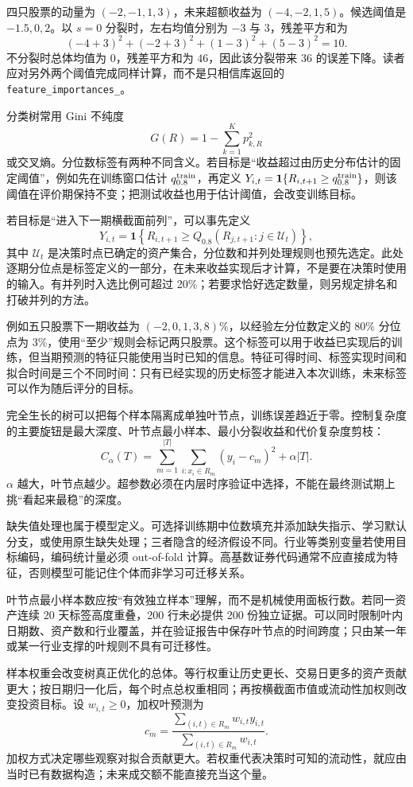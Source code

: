 四只股票的动量为 $(-2,-1,1,3)$，未来超额收益为 $(-4,-2,1,5)$。候选阈值是 $-1.5,0,2$。以 $s=0$ 分裂时，左右均值分别为 $-3$ 与 $3$，残差平方和为
\[
(-4+3)^2+(-2+3)^2+(1-3)^2+(5-3)^2=10.
\]
不分裂时总体均值为 0，残差平方和为 $46$，因此该分裂带来 $36$ 的误差下降。读者应对另外两个阈值完成同样计算，而不是只相信库返回的 \texttt{feature\_importances\_}。

分类树常用 Gini 不纯度
\[
G(R)=1-\sum_{k=1}^K p_{k,R}^2
\]
或交叉熵。分位数标签有两种不同含义。若目标是“收益超过由历史分布估计的固定阈值”，例如先在训练窗口估计 $q_{0.8}^{\rm train}$，再定义 $Y_{i,t}=\mathbf1\{R_{i,t+1}\ge q_{0.8}^{\rm train}\}$，则该阈值在评价期保持不变；把测试收益也用于估计阈值，会改变训练目标。

若目标是“进入下一期横截面前列”，可以事先定义
\[
 Y_{i,t}=\mathbf1\!\left\{R_{i,t+1}\ge
 Q_{0.8}(R_{j,t+1}:j\in\mathcal U_t)\right\},
\]
其中 $\mathcal U_t$ 是决策时点已确定的资产集合，分位数和并列处理规则也预先选定。此处逐期分位点是标签定义的一部分，在未来收益实现后才计算，不是要在决策时使用的输入。有并列时入选比例可超过 20\%；若要求恰好选定数量，则另规定排名和打破并列的方法。

例如五只股票下一期收益为 $(-2,0,1,3,8)\%$，以经验左分位数定义的 80\% 分位点为 3\%，使用“至少”规则会标记两只股票。这个标签可以用于收益已实现后的训练，但当期预测的特征只能使用当时已知的信息。特征可得时间、标签实现时间和拟合时间是三个不同时间：只有已经实现的历史标签才能进入本次训练，未来标签可以作为随后评分的目标。


完全生长的树可以把每个样本隔离成单独叶节点，训练误差趋近于零。控制复杂度的主要旋钮是最大深度、叶节点最小样本、最小分裂收益和代价复杂度剪枝：
\[
C_\alpha(T)=\sum_{m=1}^{|T|}\sum_{i:x_i\in R_m}(y_i-c_m)^2+\alpha|T|.
\]
$\alpha$ 越大，叶节点越少。超参数必须在内层时序验证中选择，不能在最终测试期上挑“看起来最稳”的深度。

缺失值处理也属于模型定义。可选择训练期中位数填充并添加缺失指示、学习默认分支，或使用原生缺失处理；三者隐含的经济假设不同。行业等类别变量若使用目标编码，编码统计量必须 out-of-fold 计算。高基数证券代码通常不应直接成为特征，否则模型可能记住个体而非学习可迁移关系。

叶节点最小样本数应按“有效独立样本”理解，而不是机械使用面板行数。若同一资产连续 20 天标签高度重叠，200 行未必提供 200 份独立证据。可以同时限制叶内日期数、资产数和行业覆盖，并在验证报告中保存叶节点的时间跨度；只由某一年或某一行业支撑的叶规则不具有可迁移性。

样本权重会改变树真正优化的总体。等行权重让历史更长、交易日更多的资产贡献更大；按日期归一化后，每个时点总权重相同；再按横截面市值或流动性加权则改变投资目标。设 $w_{i,t}\ge0$，加权叶预测为
\[
c_m=\frac{\sum_{(i,t)\in R_m}w_{i,t}y_{i,t}}
{\sum_{(i,t)\in R_m}w_{i,t}}.
\]
加权方式决定哪些观察对拟合贡献更大。若权重代表决策时可知的流动性，就应由当时已有数据构造；未来成交额不能直接充当这个量。

